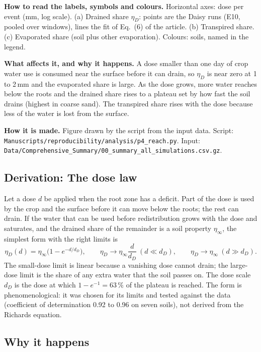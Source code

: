 \textbf{How to read the labels, symbols and colours.} Horizontal axes: dose per event (mm, log scale). (a) Drained share $\eta_D$: points are the Daisy runs (E10, pooled over windows), lines the fit of Eq.~(6) of the article. (b) Transpired share. (c) Evaporated share (soil plus other evaporation). Colours: soils, named in the legend.

\textbf{What affects it, and why it happens.} A dose smaller than one day of crop water use is consumed near the surface before it can drain, so $\eta_D$ is near zero at 1 to 2\,mm and the evaporated share is large. As the dose grows, more water reaches below the roots and the drained share rises to a plateau set by how fast the soil drains (highest in coarse sand). The transpired share rises with the dose because less of the water is lost from the surface.

\textbf{How it is made.} Figure drawn by the script from the input data. Script: \nolinkurl{Manuscripts/reproducibility/analysis/p4_reach.py}. Input: \nolinkurl{Data/Comprehensive_Summary/00_summary_all_simulations.csv.gz}.


\subsection{Derivation: The dose law}\label{der:s4:7}
Let a dose $d$ be applied when the root zone has a deficit. Part of the dose is used by the crop and the surface before it can move below the roots; the rest can drain. If the water that can be used before redistribution grows with the dose and saturates, and the drained share of the remainder is a soil property $\eta_\infty$, the simplest form with the right limits is
\begin{equation}
\eta_D(d)=\eta_\infty\bigl(1-e^{-d/d_D}\bigr),\qquad \eta_D\to\eta_\infty\frac{d}{d_D}\ (d\ll d_D),\qquad \eta_D\to\eta_\infty\ (d\gg d_D). \label{eq:s-dose}
\end{equation}
The small-dose limit is linear because a vanishing dose cannot drain; the large-dose limit is the share of any extra water that the soil passes on. The dose scale $d_D$ is the dose at which $1-e^{-1}=63\,\%$ of the plateau is reached. The form is phenomenological: it was chosen for its limits and tested against the data (coefficient of determination 0.92 to 0.96 on seven soils), not derived from the Richards equation.


\subsection{Why it happens}
